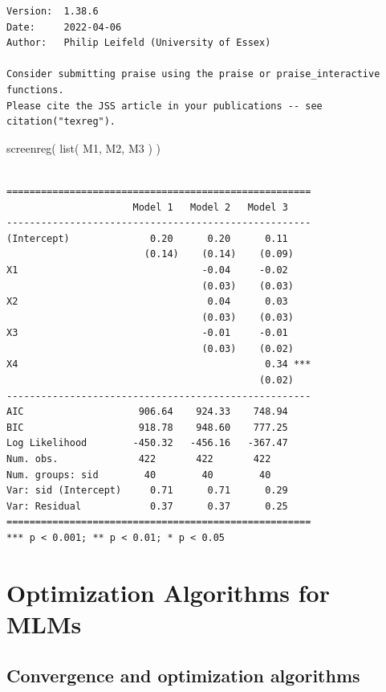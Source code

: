 \documentclass[
  letterpaper,
  DIV=11,
  numbers=noendperiod]{scrreprt}
\newenvironment{Shaded}{\begin{snugshade}}{\end{snugshade}}
\newcommand{\FunctionTok}[1]{\textcolor[rgb]{0.02,0.16,0.49}{#1}}
\newcommand{\NormalTok}[1]{\textcolor[rgb]{0.00,0.44,0.13}{#1}}
\begin{document}
\begin{verbatim}
Version:  1.38.6
Date:     2022-04-06
Author:   Philip Leifeld (University of Essex)

Consider submitting praise using the praise or praise_interactive functions.
Please cite the JSS article in your publications -- see citation("texreg").
\end{verbatim}

\begin{Shaded}
\begin{Highlighting}[]
\FunctionTok{screenreg}\NormalTok{( }\FunctionTok{list}\NormalTok{( M1, M2, M3 ) )}
\end{Highlighting}
\end{Shaded}

\begin{verbatim}

=====================================================
                      Model 1   Model 2   Model 3    
-----------------------------------------------------
(Intercept)              0.20      0.20      0.11    
                        (0.14)    (0.14)    (0.09)   
X1                                -0.04     -0.02    
                                  (0.03)    (0.03)   
X2                                 0.04      0.03    
                                  (0.03)    (0.03)   
X3                                -0.01     -0.01    
                                  (0.03)    (0.02)   
X4                                           0.34 ***
                                            (0.02)   
-----------------------------------------------------
AIC                    906.64    924.33    748.94    
BIC                    918.78    948.60    777.25    
Log Likelihood        -450.32   -456.16   -367.47    
Num. obs.              422       422       422       
Num. groups: sid        40        40        40       
Var: sid (Intercept)     0.71      0.71      0.29    
Var: Residual            0.37      0.37      0.25    
=====================================================
*** p < 0.001; ** p < 0.01; * p < 0.05
\end{verbatim}

\hypertarget{optimization-algorithms-for-mlms}{%
\chapter{Optimization Algorithms for
MLMs}\label{optimization-algorithms-for-mlms}}

\hypertarget{convergence-and-optimization-algorithms}{%
\section{Convergence and optimization
algorithms}\label{convergence-and-optimization-algorithms}}
\end{document}
